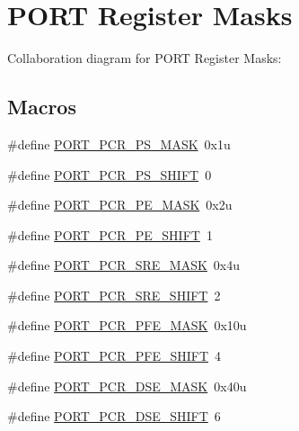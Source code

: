 \hypertarget{group___p_o_r_t___register___masks}{}\section{P\+O\+RT Register Masks}
\label{group___p_o_r_t___register___masks}
Collaboration diagram for P\+O\+RT Register Masks\+:
\subsection*{Macros}
\begin{DoxyCompactItemize}
\item 
\#define \hyperlink{group___p_o_r_t___register___masks_ga075e53298ec26cb1b463c95b902c39c1}{P\+O\+R\+T\+\_\+\+P\+C\+R\+\_\+\+P\+S\+\_\+\+M\+A\+SK}~0x1u
\item 
\#define \hyperlink{group___p_o_r_t___register___masks_ga7c040fa4d37750af5fef3ea1d0e370a9}{P\+O\+R\+T\+\_\+\+P\+C\+R\+\_\+\+P\+S\+\_\+\+S\+H\+I\+FT}~0
\item 
\#define \hyperlink{group___p_o_r_t___register___masks_ga125482aa2497e8435dac49c039b7fa97}{P\+O\+R\+T\+\_\+\+P\+C\+R\+\_\+\+P\+E\+\_\+\+M\+A\+SK}~0x2u
\item 
\#define \hyperlink{group___p_o_r_t___register___masks_ga18556773988cdd78e363959884dbec46}{P\+O\+R\+T\+\_\+\+P\+C\+R\+\_\+\+P\+E\+\_\+\+S\+H\+I\+FT}~1
\item 
\#define \hyperlink{group___p_o_r_t___register___masks_ga9cdf02a7b160ee528de8e18aad2cae60}{P\+O\+R\+T\+\_\+\+P\+C\+R\+\_\+\+S\+R\+E\+\_\+\+M\+A\+SK}~0x4u
\item 
\#define \hyperlink{group___p_o_r_t___register___masks_ga87657ecdc18eb5b344d4e399a3a2fb70}{P\+O\+R\+T\+\_\+\+P\+C\+R\+\_\+\+S\+R\+E\+\_\+\+S\+H\+I\+FT}~2
\item 
\#define \hyperlink{group___p_o_r_t___register___masks_ga7f1f5c3812018f9ed4d84a187146ba91}{P\+O\+R\+T\+\_\+\+P\+C\+R\+\_\+\+P\+F\+E\+\_\+\+M\+A\+SK}~0x10u
\item 
\#define \hyperlink{group___p_o_r_t___register___masks_gae7d057ebd3218784fca57f55a85f2d29}{P\+O\+R\+T\+\_\+\+P\+C\+R\+\_\+\+P\+F\+E\+\_\+\+S\+H\+I\+FT}~4
\item 
\#define \hyperlink{group___p_o_r_t___register___masks_gae1c37b9f66e58bd80e7764232fd05cee}{P\+O\+R\+T\+\_\+\+P\+C\+R\+\_\+\+D\+S\+E\+\_\+\+M\+A\+SK}~0x40u
\item 
\#define \hyperlink{group___p_o_r_t___register___masks_ga00ae08038ade5432d0240666658d8867}{P\+O\+R\+T\+\_\+\+P\+C\+R\+\_\+\+D\+S\+E\+\_\+\+S\+H\+I\+FT}~6

\end{DoxyCompactItemize}
